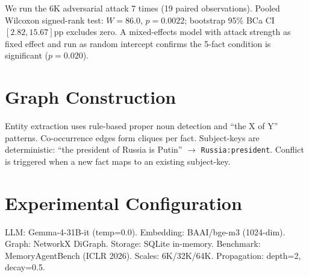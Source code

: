 \documentclass{article}
\begin{document}
We run the 6K adversarial attack 7 times (19 paired observations).
Pooled Wilcoxon signed-rank test: $W = 86.0$, $p = 0.0022$; bootstrap 95\% BCa CI $[2.82, 15.67]$pp excludes zero.
A mixed-effects model with attack strength as fixed effect and run as random intercept confirms the 5-fact condition is significant ($p = 0.020$).

\section{Graph Construction}
\label{app:graph}

Entity extraction uses rule-based proper noun detection and ``the X of Y'' patterns.
Co-occurrence edges form cliques per fact.
Subject-keys are deterministic: ``the president of Russia is Putin'' $\rightarrow$ \texttt{Russia:president}.
Conflict is triggered when a new fact maps to an existing subject-key.

\section{Experimental Configuration}
\label{app:config}

LLM: Gemma-4-31B-it (temp=0.0). Embedding: BAAI/bge-m3 (1024-dim). Graph: NetworkX DiGraph. Storage: SQLite in-memory. Benchmark: MemoryAgentBench (ICLR 2026). Scales: 6K/32K/64K. Propagation: depth=2, decay=0.5.
\end{document}
